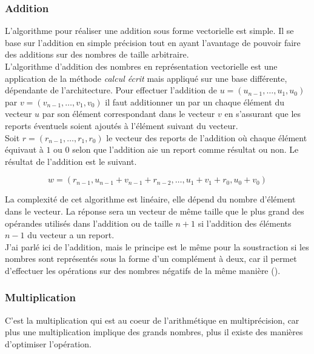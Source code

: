 \documentclass[letterpaper]{article}
\begin{document}
\subsubsection{Addition}

L'algorithme pour réaliser une addition sous forme vectorielle est simple.
Il se base sur l'addition en simple précision tout en ayant l'avantage de
pouvoir faire des additions sur des nombres de taille arbitraire. \\

L'algorithme d'addition des nombres en représentation vectorielle est une
application de la méthode \emph{calcul écrit} mais appliqué sur une base
différente, dépendante de l'architecture. Pour effectuer l'addition de $u =
(u_{n - 1}, \dots, u_1, u_0)$ par $v = (v_{n - 1}, \dots, v_1, v_0)$ il faut
additionner un par un chaque élément du vecteur $u$ par son élément
correspondant dans le vecteur $v$ en s'assurant que les reports éventuels
soient ajoutés à l'élément suivant du vecteur.\\

Soit $r = (r_{n - 1}, \dots, r_{1}, r_{0})$ le vecteur des reports de
l'addition où chaque élément équivaut à $1$ ou $0$ selon que l'addition aie un
report comme résultat ou non. Le résultat de l'addition est le suivant.

$$w = (r_{n - 1}, u_{n - 1} + v_{n - 1} + r_{n - 2}, \dots, u_1 + v_1 + r_0, u_0 + v_0)$$

La complexité de cet algorithme est linéaire, elle  dépend du nombre d'élément
dans le vecteur.
La réponse sera un vecteur de même taille que le plus grand des opérandes
utilisés dans l'addition ou de taille $n + 1$ si l'addition des éléments $n - 1$
du vecteur a un report.\\

J'ai parlé ici de l'addition, mais le principe est le même pour la soustraction
si les nombres sont représentés sous la forme d'un complément à deux, car il
permet d'effectuer les opérations sur des nombres négatifs de la même
manière (\cite{wikicomplementtwo}).

\subsubsection{Multiplication}

C'est la multiplication qui est au coeur de l'arithmétique en multiprécision,
car plus une multiplication implique des grands nombres, plus il existe des
manières d'optimiser l'opération.\\
\end{document}
